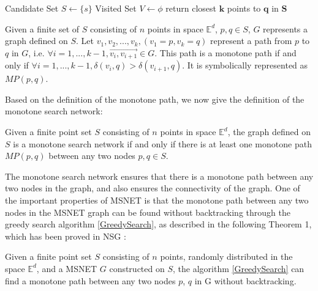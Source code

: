 \begin{algorithm}[h]
	\caption{$GreedySearch(G,s,q,k,l)$}
	\label{GreedySearch}
	Candidate Set $S \leftarrow \{s\}$\;
	Visited Set $V \leftarrow \phi$\;
	return closest $\mathbf{k}$ points to $\mathbf{q}$ in $\mathbf{S}$\;
\end{algorithm}

\begin{definition}\label{monotonic_path}
	Given a finite set of $S$ consisting of $n$ points in space $\mathbb{E}^d$, $p,q \in S$, $G$ represents a graph defined on $S$. Let $v_1,v_2,...,v_k, (v_1 = p, v_k = q )$ represent a path from $p$ to $q$ in $G$, i.e. $\forall i=1,...,k-1, \overrightarrow{v_i,v_{i+1}} \in G$. This path is a monotone path if and only if $\forall i=1,...,k-1,\delta (v_i, q)>\delta (v_{i+1}, q)$. It is symbolically represented as $MP(p,q)$.
\end{definition}

Based on the definition of the monotone path, we now give the definition of the monotone search network:

\begin{definition}\label{msnet}
	Given a finite point set $S$ consisting of $n$ points in space $\mathbb{E}^d$, the graph defined on $S$ is a monotone search network if and only if there is at least one monotone path $MP(p,q)$ between any two nodes $p,q \in S$.
\end{definition}

The monotone search network ensures that there is a monotone path between any two nodes in the graph, and also ensures the connectivity of the graph. One of the important properties of MSNET is that the monotone path between any two nodes in the MSNET graph can be found without backtracking through the greedy search algorithm \ref{GreedySearch}, as described in the following Theorem 1, which has been proved in NSG \cite{DBLP:journals/pvldb/FuXWC19}:

\begin{theorem}\label{msnet_search}
	Given a finite point set $S$ consisting of $n$ points, randomly distributed in the space $\mathbb{E}^d$, and a MSNET $G$ constructed on $S$, the algorithm \ref{GreedySearch} can find a monotone path between any two nodes $p$, $q$ in G without backtracking.
\end{theorem}


